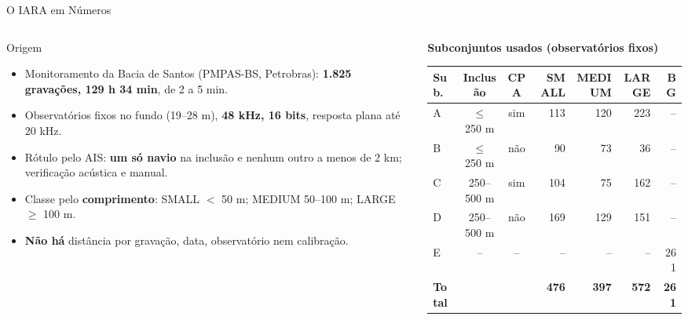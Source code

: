\documentclass[aspectratio=169]{beamer}
\begin{document}
\begin{frame}{O IARA em Números}
    \footnotesize
    \begin{columns}[T]
        \begin{column}{0.44\textwidth}
            \begin{block}{\small Origem}
                \scriptsize
                \begin{itemize}
                    \setlength{\itemsep}{1pt}
                    \item Monitoramento da Bacia de Santos (PMPAS-BS, Petrobras): \textbf{1.825 gravações, 129 h 34 min}, de 2 a 5 min.
                    \item Observatórios fixos no fundo (19--28 m), \textbf{48 kHz, 16 bits}, resposta plana até 20 kHz.
                    \item Rótulo pelo AIS: \textbf{um só navio} na inclusão e nenhum outro a menos de 2 km; verificação acústica e manual.
                    \item Classe pelo \textbf{comprimento}: SMALL $<$ 50 m; MEDIUM 50--100 m; LARGE $\geq$ 100 m.
                    \item \textbf{Não há} distância por gravação, data, observatório nem calibração.
                \end{itemize}
            \end{block}
        \end{column}
        \begin{column}{0.54\textwidth}
            \centering
            \scriptsize
            \textbf{Subconjuntos usados (observatórios fixos)}\\[3pt]
            \tiny\setlength{\tabcolsep}{3pt}
            \begin{tabular}{@{}lccrrrr@{}}
                \toprule
                Sub. & Inclusão & CPA & SMALL & MEDIUM & LARGE & BG \\
                \midrule
                A & $\leq$ 250 m & sim & 113 & 120 & 223 & -- \\
                B & $\leq$ 250 m & não & 90 & 73 & 36 & -- \\
                C & 250--500 m & sim & 104 & 75 & 162 & -- \\
                D & 250--500 m & não & 169 & 129 & 151 & -- \\
                E & -- & -- & -- & -- & -- & 261 \\
                \midrule
                \textbf{Total} & & & \textbf{476} & \textbf{397} & \textbf{572} & \textbf{261} \\

\end{tabular}
\end{column}
\end{columns}
\end{frame}
\end{document}
